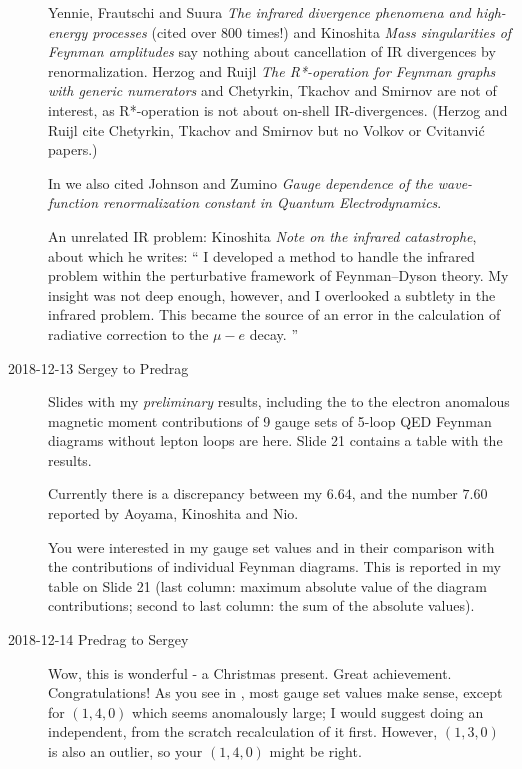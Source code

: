 \begin{description}
Yennie, Frautschi and Suura
{\em The infrared divergence phenomena and high-energy processes}
(cited over 800 times!) and
Kinoshita
{\em Mass singularities of {Feynman} amplitudes}
say nothing about cancellation of IR divergences by renormalization.
Herzog and Ruijl
{\em The {R*}-operation for {Feynman} graphs with generic numerators}
and Chetyrkin, Tkachov and
Smirnov
are not of interest, as {R*}-operation is not about on-shell IR-divergences.
(Herzog and Ruijl cite Chetyrkin, Tkachov and
Smirnov but no
Volkov or
Cvitanvi\'c papers.)

In  we also cited
Johnson and Zumino {\em Gauge dependence of the
wave-function renormalization constant in {Quantum Electrodynamics}}.

An unrelated IR problem: Kinoshita {\em Note on the infrared
catastrophe}, about which he writes: ``
I developed a method to handle the infrared problem within the
perturbative framework of Feynman–Dyson theory. My
insight was not deep enough, however, and I overlooked a subtlety in the
infrared problem. This became the source of an error in the calculation
of radiative correction to the $\mu-e$ decay.
''

\newpage
\item[2018-12-13 Sergey to Predrag]
Slides with my \emph{preliminary} results, including the  to the electron
anomalous magnetic moment contributions of 9 gauge sets of 5-loop QED
Feynman diagrams without lepton loops are
{here}. Slide 21 contains a table with the results.

Currently there is a discrepancy between my $6.64$, and the
number $7.60$ reported by Aoyama, Kinoshita and Nio.

You were interested in my gauge set values and in
their comparison with the contributions of individual Feynman
diagrams. This is reported in my table on Slide
21 (last column: maximum absolute value of the diagram contributions;
second to last column: the sum of the absolute values).

\item[2018-12-14 Predrag to Sergey]
Wow, this is wonderful - a Christmas present. Great achievement.
Congratulations! As you see in , most gauge set
values make sense, except for $(1,4,0)$ which seems anomalously
large; I would suggest doing an independent, from the scratch
recalculation of it first. However, $(1,3,0)$ is also an outlier, so
your $(1,4,0)$ might be right.


\end{description}
